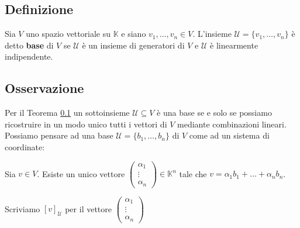 \documentclass[a4paper]{article}
\theoremstyle{break}
\theoremstyle{break}
\theoremstyle{break}
\theoremstyle{break}
\begin{document}
\subsection{Definizione}
\label{def:base}
Sia \( V \) uno spazio vettoriale su \( \mathbb{K} \) e siano \( v_1, \ldots, v_n \in V \).
L'insieme \( \mathcal{U} = \{v_1, \ldots, v_n\}  \) è detto \textbf{base} di \( V \) 
se \( \mathcal{U} \) è un insieme di generatori di \( V \) e \( \mathcal{U} \) è linearmente
indipendente.

\subsection{Osservazione}
Per il Teorema \ref{def:base} un sottoinsieme \( \mathcal{U} \subseteq V \) è una base
se e solo se possiamo ricostruire in un modo unico tutti i vettori di \( V \) mediante
combinazioni lineari. Possiamo pensare ad una base \( \mathcal{U} = \{b_1, \ldots, b_n\}  \) 
di \( V \) come ad un sistema di coordinate:

\noindent Sia \( v \in V \). Esiste un unico vettore \( \begin{pmatrix} 
  \alpha_1 \\
  \vdots \\
  \alpha_n
\end{pmatrix} \in \mathbb{K}^n  \) tale che \( v = \alpha_1 b_1 + \ldots + \alpha_n b_n \).

\noindent Scriviamo \( [v]_\mathcal{U} \) per il vettore \( \begin{pmatrix} 
  \alpha_1\\
  \vdots\\
  \alpha_n
\end{pmatrix}  \) 
\end{document}
